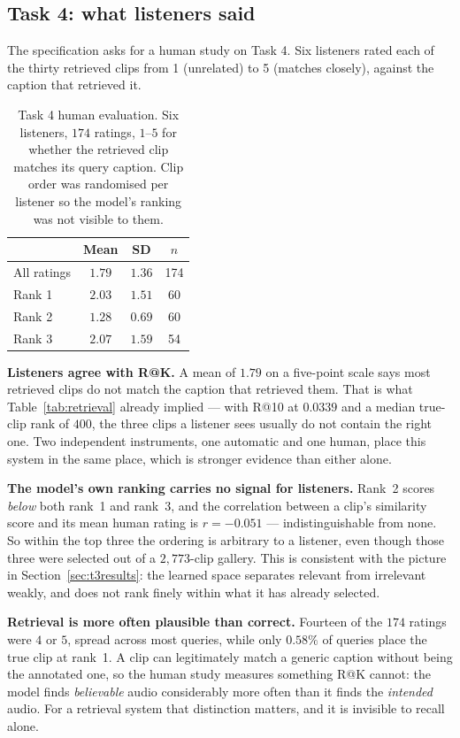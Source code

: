 \documentclass[conference]{IEEEtran}
\begin{document}
\subsection{Task 4: what listeners said}

The specification asks for a human study on Task 4. Six listeners rated each of
the thirty retrieved clips from 1 (unrelated) to 5 (matches closely), against
the caption that retrieved it.

\begin{table}[H]
\centering\small
\caption{Task 4 human evaluation. Six listeners, $174$ ratings, $1$--$5$ for
whether the retrieved clip matches its query caption. Clip order was randomised
per listener so the model's ranking was not visible to them.}
\label{tab:human}
\begin{tabular}{lccc}
\toprule
& Mean & SD & $n$ \\
\midrule
All ratings & $1.79$ & $1.36$ & 174 \\
\midrule
Rank 1 & $2.03$ & $1.51$ & 60 \\
Rank 2 & $1.28$ & $0.69$ & 60 \\
Rank 3 & $2.07$ & $1.59$ & 54 \\
\bottomrule
\end{tabular}
\end{table}

\noindent \textbf{Listeners agree with R@K.} A mean of $1.79$ on a five-point
scale says most retrieved clips do not match the caption that retrieved them.
That is what Table~\ref{tab:retrieval} already implied --- with R@10 at
$0.0339$ and a median true-clip rank of $400$, the three clips a listener sees
usually do not contain the right one. Two independent instruments, one
automatic and one human, place this system in the same place, which is stronger
evidence than either alone.

\textbf{The model's own ranking carries no signal for listeners.} Rank~2 scores
\emph{below} both rank~1 and rank~3, and the correlation between a clip's
similarity score and its mean human rating is $r = -0.051$ --- indistinguishable
from none. So within the top three the ordering is arbitrary to a listener, even
though those three were selected out of a $2{,}773$-clip gallery. This is
consistent with the picture in Section~\ref{sec:t3results}: the learned space
separates relevant from irrelevant weakly, and does not rank finely within what
it has already selected.

\textbf{Retrieval is more often plausible than correct.} Fourteen of the $174$
ratings were $4$ or $5$, spread across most queries, while only $0.58\%$ of
queries place the true clip at rank~1. A clip can legitimately match a generic
caption without being the annotated one, so the human study measures something
R@K cannot: the model finds \emph{believable} audio considerably more often than
it finds the \emph{intended} audio. For a retrieval system that distinction
matters, and it is invisible to recall alone.
\end{document}
